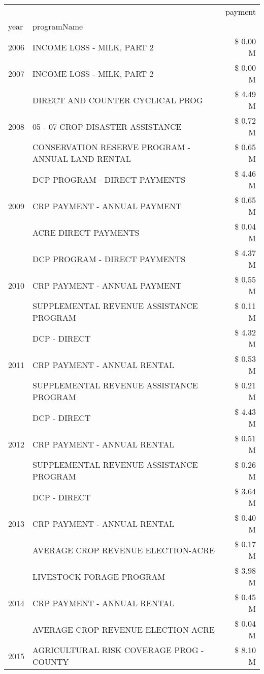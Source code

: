 \begin{tabular}{llr}
\toprule
 &  & payment \\
year & programName &  \\
\midrule
2006 & INCOME LOSS - MILK, PART 2 & \$ 0.00 M \\
\cline{1-3}
2007 & INCOME LOSS - MILK, PART 2 & \$ 0.00 M \\
\cline{1-3}
\multirow[t]{3}{*}{2008} & DIRECT AND COUNTER CYCLICAL PROG & \$ 4.49 M \\
 & 05 - 07 CROP DISASTER ASSISTANCE & \$ 0.72 M \\
 & CONSERVATION RESERVE PROGRAM - ANNUAL LAND RENTAL & \$ 0.65 M \\
\cline{1-3}
\multirow[t]{3}{*}{2009} & DCP PROGRAM - DIRECT PAYMENTS & \$ 4.46 M \\
 & CRP PAYMENT - ANNUAL PAYMENT & \$ 0.65 M \\
 & ACRE DIRECT PAYMENTS & \$ 0.04 M \\
\cline{1-3}
\multirow[t]{3}{*}{2010} & DCP PROGRAM - DIRECT PAYMENTS & \$ 4.37 M \\
 & CRP PAYMENT - ANNUAL PAYMENT & \$ 0.55 M \\
 & SUPPLEMENTAL REVENUE ASSISTANCE PROGRAM & \$ 0.11 M \\
\cline{1-3}
\multirow[t]{3}{*}{2011} & DCP - DIRECT & \$ 4.32 M \\
 & CRP PAYMENT - ANNUAL RENTAL & \$ 0.53 M \\
 & SUPPLEMENTAL REVENUE ASSISTANCE PROGRAM & \$ 0.21 M \\
\cline{1-3}
\multirow[t]{3}{*}{2012} & DCP - DIRECT & \$ 4.43 M \\
 & CRP PAYMENT - ANNUAL RENTAL & \$ 0.51 M \\
 & SUPPLEMENTAL REVENUE ASSISTANCE PROGRAM & \$ 0.26 M \\
\cline{1-3}
\multirow[t]{3}{*}{2013} & DCP - DIRECT & \$ 3.64 M \\
 & CRP PAYMENT - ANNUAL RENTAL & \$ 0.40 M \\
 & AVERAGE CROP REVENUE ELECTION-ACRE & \$ 0.17 M \\
\cline{1-3}
\multirow[t]{3}{*}{2014} & LIVESTOCK FORAGE PROGRAM & \$ 3.98 M \\
 & CRP PAYMENT - ANNUAL RENTAL & \$ 0.45 M \\
 & AVERAGE CROP REVENUE ELECTION-ACRE & \$ 0.04 M \\
\cline{1-3}
\multirow[t]{3}{*}{2015} & AGRICULTURAL RISK COVERAGE PROG - COUNTY & \$ 8.10 M \\

\end{tabular}
